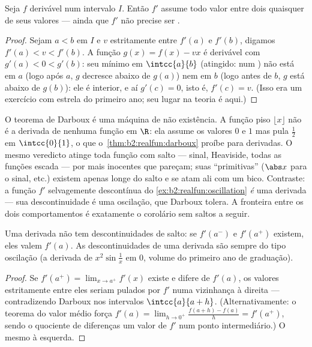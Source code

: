 \begin{theorem}[Darboux]\label{thm:b2:realfun:darboux}
Seja $f$ derivável num intervalo $I$. Então $f'$ assume todo
valor entre dois quaisquer de seus valores --- ainda que $f'$ não precise ser
.
\end{theorem}

\begin{proof}
Sejam $a < b$ em $I$ e $v$ estritamente entre $f'(a)$ e $f'(b)$,
digamos $f'(a) < v < f'(b)$. A função $g(x) = f(x) - vx$ é
derivável com $g'(a) < 0 < g'(b)$: seu mínimo em
$\intcc{a}{b}$ (atingido:  num ) não está em $a$
(logo após $a$, $g$ decresce abaixo de $g(a)$) nem em $b$ (logo
antes de $b$, $g$ está abaixo de $g(b)$): ele é interior, e aí $g'(c)
= 0$, isto é, $f'(c) = v$. (Isso era um exercício com estrela do primeiro ano; seu
lugar na teoria é aqui.)
\end{proof}

\begin{example}\label{ex:b2:realfun:whichderivatives}
O teorema de Darboux é uma máquina de não existência. A função piso
$\lfloor x\rfloor$ não é a derivada de nenhuma função em
$\R$: ela assume os valores $0$ e $1$ mas pula $\frac12$ em
$\intcc{0}{1}$, o que o~\cref{thm:b2:realfun:darboux} proíbe para
derivadas. O mesmo veredicto atinge toda função com salto
--- sinal, Heaviside, todas as funções escada --- por mais inocentes
que pareçam; suas ``primitivas'' ($\abs x$ para o sinal, etc.)
existem apenas longe do salto e se atam ali com um bico.
Contraste: a função $f'$ selvagemente descontínua do
\cref{ex:b2:realfun:oscillation} \emph{é} uma derivada --- sua
descontinuidade é uma oscilação, que Darboux tolera. A
fronteira entre os dois comportamentos é exatamente o
corolário sem saltos a seguir.
\end{example}

\begin{corollary}\label{cor:b2:realfun:nojumps}
Uma derivada não tem descontinuidades de salto: se $f'(a^-)$ e
$f'(a^+)$ existem, eles valem $f'(a)$. As descontinuidades de uma
derivada são sempre do tipo oscilação (a derivada de $x^2\sin\frac1x$
em $0$, volume do primeiro ano de graduação).
\end{corollary}

\begin{proof}
Se $f'(a^+) = \lim_{x\to a^+} f'(x)$ existe e difere de
$f'(a)$, os valores estritamente entre eles seriam pulados por $f'$ numa
vizinhança à direita --- contradizendo Darboux nos intervalos
$\intcc{a}{a + h}$. (Alternativamente: o teorema do valor médio força
$f'(a) = \lim_{h\to0^+} \frac{f(a+h)-f(a)}{h} = f'(a^+)$, sendo o
quociente de diferenças um valor de $f'$ num ponto intermediário.)
O mesmo à esquerda.
\end{proof}


